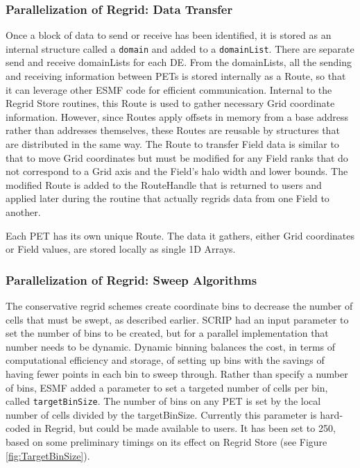 \subsubsection{Parallelization of Regrid: Data Transfer}
Once a block of data to send or receive has been identified, it is stored as an
internal structure called a {\tt domain} and added to a {\tt domainList}.  There
are separate send and receive domainLists for each DE.  From the domainLists,
all the sending and receiving information between PETs is stored internally as a
Route, so that it can leverage other ESMF code for efficient communication.
Internal to the Regrid Store routines, this Route is used to gather necessary
Grid coordinate information.  However, since Routes apply offsets in memory from
a base address rather than addresses themselves, these Routes are reusable by
structures that are distributed in the same way.  The Route to transfer Field
data is similar to that to move Grid coordinates but must be modified for any
Field ranks that do not correspond to a Grid axis and the Field's halo width and
lower bounds.   The modified Route is added to the RouteHandle that is returned
to users and applied later during the routine that actually regrids data from
one Field to another.

Each PET has its own unique Route.  The data it gathers, either Grid coordinates
or Field values, are stored locally as single 1D Arrays.


\subsubsection{Parallelization of Regrid: Sweep Algorithms}
The conservative regrid schemes create coordinate bins to decrease the
number of cells that must be swept, as described earlier.  SCRIP
had an input parameter to set the number of bins to be created, but for a
parallel implementation that number needs to be dynamic.  Dynamic binning
balances the cost, in terms of computational efficiency and storage, of setting
up bins with the savings of having fewer points in each bin to sweep through.  
Rather than specify a number of bins, ESMF added a parameter to set a targeted
number of cells per bin, called {\tt targetBinSize}.  The number of bins on any
PET is set by the local number of cells divided by the targetBinSize.  Currently
this parameter is hard-coded in Regrid, but could be made available to users.
It has been set to 250, based on some preliminary timings on its effect on
Regrid Store (see Figure \ref{fig:TargetBinSize}).

